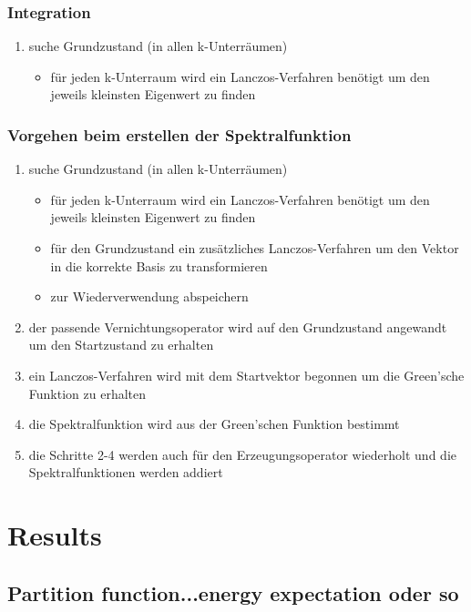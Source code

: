 \documentclass{beamer}
\begin{document}
\begin{frame}
\frametitle{Integration}
\begin{enumerate}
	\item suche Grundzustand (in allen k-Unterräumen)
	\begin{itemize}
		\item für jeden k-Unterraum wird ein Lanczos-Verfahren benötigt um den jeweils kleinsten Eigenwert zu finden
	\end{itemize}
\end{enumerate}
\vbox{}\vbox{}\vbox{}\vbox{}\vbox{}\vbox{}\vbox{}\vbox{}\vbox{}\vbox{}\vbox{}\vbox{}
\end{frame}



\begin{frame}
\frametitle{Vorgehen beim erstellen der Spektralfunktion}
\begin{enumerate}
\item suche Grundzustand (in allen k-Unterräumen)
\begin{itemize}
	\item für jeden k-Unterraum wird ein Lanczos-Verfahren benötigt um den jeweils kleinsten Eigenwert zu finden
	\item für den Grundzustand ein zusätzliches Lanczos-Verfahren um den Vektor in die korrekte Basis zu transformieren\pause
	\item zur Wiederverwendung abspeichern\pause
\end{itemize}
\item der passende Vernichtungsoperator wird auf den Grundzustand angewandt um den Startzustand zu erhalten\pause
\item ein Lanczos-Verfahren wird mit dem Startvektor begonnen um die Green'sche Funktion zu erhalten\pause
\item die Spektralfunktion wird aus der Green'schen Funktion bestimmt\pause
\item die Schritte 2-4 werden auch für den Erzeugungsoperator wiederholt und die Spektralfunktionen werden addiert
\end{enumerate}
\end{frame}

\section{Results}
\subsection{Partition function...energy expectation oder so}
%
\end{document}
